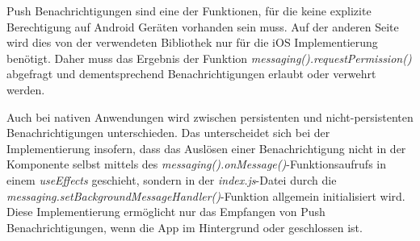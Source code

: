 Push Benachrichtigungen sind eine der Funktionen, für die keine explizite Berechtigung auf Android Geräten vorhanden sein muss.
Auf der anderen Seite wird dies von der verwendeten Bibliothek nur für die iOS Implementierung benötigt.
Daher muss das Ergebnis der Funktion \textit{messaging().requestPermission()} abgefragt und dementsprechend Benachrichtigungen erlaubt oder verwehrt werden.

Auch bei nativen Anwendungen wird zwischen persistenten und nicht-persistenten Benachrichtigungen unterschieden.
Das unterscheidet sich bei der Implementierung insofern, dass das Auslösen einer Benachrichtigung nicht in der Komponente selbst mittels des \textit{messaging().onMessage()}-Funktionsaufrufs in einem \textit{useEffects} geschieht, sondern in der \textit{index.js}-Datei durch die \textit{messaging.setBackgroundMessageHandler()}-Funktion allgemein initialisiert wird.
Diese Implementierung ermöglicht nur das Empfangen von Push Benachrichtigungen, wenn die App im Hintergrund oder geschlossen ist.